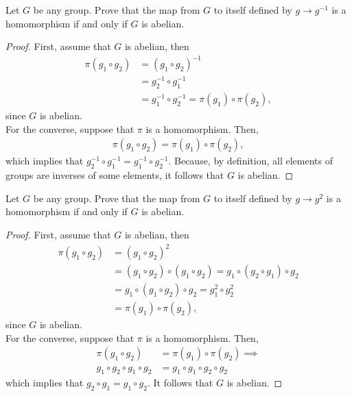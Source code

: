 \documentclass[12pt]{article}
\newenvironment{problem}[2][Problem]{\begin{trivlist} \item[\hskip \labelsep {\bfseries #1}\hskip \labelsep {\bfseries #2.}]}{\end{trivlist}}
\begin{document}
\begin{problem}{17}
  Let $G$ be any group. Prove that the map from $G$ to itself defined by $g\to g^{-1}$ is a homomorphism if and only if $G$ is abelian.
\begin{proof}
  First, assume that $G$ is abelian, then
\begin{align*}
  \pi( g_{1} \circ g_{2} ) &= \left( g_{1}\circ g_{2} \right)^{-1}\\
  &= g_{2}^{-1}\circ g_{1}^{-1}\\
  &= g_{1}^{-1}\circ g_{2}^{-1} = \pi(g_{1}) \circ \pi(g_{2}),
\end{align*}
since $G$ is abelian.\\

For the converse, suppose that $\pi$ is a homomorphism. Then, 
\begin{align*}
  \pi(g_{1}\circ g_{2}) = \pi(g_{1}) \circ \pi(g_{2}),
\end{align*}
which implies that $g_{2}^{-1}\circ g_{1}^{-1} = g_{1}^{-1}\circ g_{2}^{-1}$. Because, by definition, all elements of groups are inverses of some elements, it follows that $G$ is abelian.
\end{proof}
\end{problem}
\begin{problem}{18}
  Let $G$ be any group. Prove that the map from $G$ to itself defined by $g\to g^{2}$ is a homomorphism if and only if $G$ is abelian.
\begin{proof}
  First, assume that $G$ is abelian, then
\begin{align*}
  \pi( g_{1} \circ g_{2} ) &= \left( g_{1}\circ g_{2} \right)^{2}\\
  &= (g_{1}\circ g_{2})\circ (g_{1}\circ g_{2}) = g_{1}\circ ( g_{2} \circ g_{1} ) \circ g_{2}\\
  &= g_{1}\circ (g_{1}\circ g_{2})\circ g_{2} = g_{1}^{2}\circ g_{2}^{2}\\
  &= \pi(g_{1}) \circ \pi(g_{2}),
\end{align*}
since $G$ is abelian.\\

For the converse, suppose that $\pi$ is a homomorphism. Then, 
\begin{align*}
  \pi(g_{1}\circ g_{2}) &= \pi(g_{1}) \circ \pi(g_{2})\implies\\
  g_{1}\circ g_{2}\circ g_{1}\circ g_{2} &= g_{1}\circ g_{1} \circ g_{2} \circ g_{2}
\end{align*}
which implies that $g_{2}\circ g_{1} = g_{1}\circ g_{2}$. It follows that $G$ is abelian.
\end{proof}
\end{problem}
\end{document}
